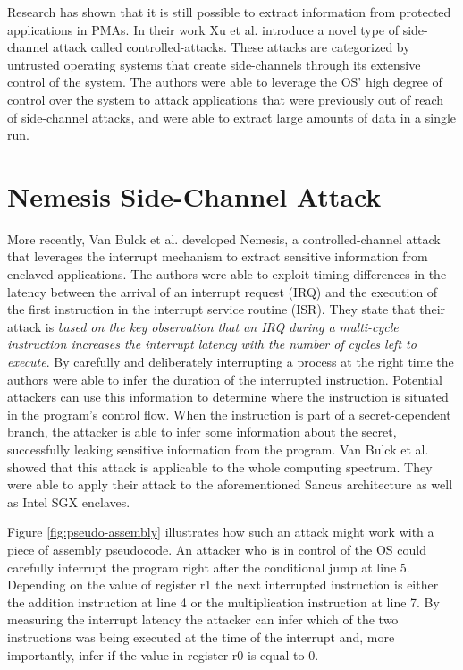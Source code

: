 Research has shown that it is still possible to extract information from protected applications in PMAs. In their work Xu et al. \cite{Xu} introduce a novel type of side-channel attack 
called controlled-attacks. These attacks are categorized by untrusted operating systems that create side-channels through its extensive control of the system.
The authors were able to leverage the OS' high degree of control over the system to attack applications that were previously out of reach of side-channel attacks, and were able to 
extract large amounts of data in a single run. 

\section{Nemesis Side-Channel Attack}
\label{sec:nemesis}
More recently, Van Bulck et al. \cite{Nemesis} developed Nemesis, a controlled-channel attack that leverages the interrupt mechanism to extract sensitive information from 
enclaved applications. The authors were able to exploit timing differences in the latency between the arrival of an interrupt request (IRQ) and the execution of the first instruction in the 
interrupt service routine (ISR). They state that their attack is \textit{based on the key observation that an IRQ during a multi-cycle instruction increases the interrupt 
latency with the number of cycles left to execute}. By carefully and deliberately interrupting a process at the right time the authors were able to infer the duration of the interrupted instruction. 
Potential attackers can use this information to determine where the instruction is situated in the program's control flow. When the instruction is part of a secret-dependent branch, the 
attacker is able to infer some information about the secret, successfully leaking sensitive information from the program. Van Bulck et al. \cite{Nemesis} showed that this attack is applicable to 
the whole computing spectrum. They were able to apply their attack to the aforementioned Sancus architecture as well as Intel SGX enclaves.  

Figure \ref{fig:pseudo-assembly} illustrates how such an attack might work with a piece of assembly pseudocode. An attacker who is in control of the OS could carefully interrupt the program right
after the conditional jump at line 5. Depending on the value of register r1 the next interrupted instruction is either the addition instruction at line 4 or the multiplication instruction at line 7. 
By measuring the interrupt latency the attacker can infer which of the two instructions was being executed at the time of the interrupt and, more importantly, infer if the value in register r0 is equal to 0. 



